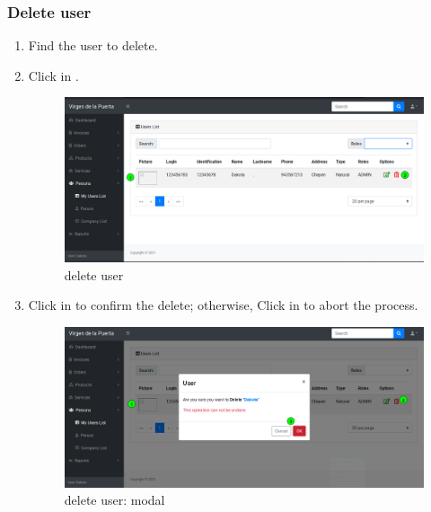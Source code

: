 \documentclass[a4paper,11pt]{refart}
\begin{document}
\subsubsection{Delete user}
\begin{enumerate}
	\item Find the user to delete.
	\item Click in .
	\begin{figure}[H]\centering
		\includegraphics[width=\textwidth]{images/user_list-delete.png}
		\caption{delete user}
		\label{fig:user_list-delete.png}
	\end{figure}
	\item Click in  to confirm the delete; otherwise, Click in  to abort the process.
	\begin{figure}[H]\centering
		\includegraphics[width=\textwidth]{images/user_list-delete-modal.png}
		\caption{delete user: modal}
		\label{fig:user_list-delete-modal.png}
	\end{figure}
\end{enumerate}
\end{document}
